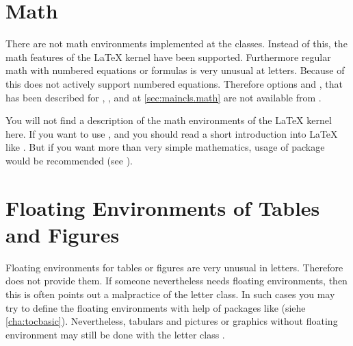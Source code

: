 \section{Math}
%
\BeginIndexGroup
{}%
%
%

There are not math environments implemented at the \KOMAScript{}
classes. Instead of this, the math features of the \LaTeX{} kernel have been
supported. Furthermore regular math with numbered
equations or formulas is very unusual at letters. Because of this
 does not actively support numbered equations. Therefore
options  and ,
that has been described for , , and
 at \autoref{sec:maincls.math} are not available from
.

You will not find a description of the math environments of the \LaTeX{} kernel
here. If you want to use ,
 and
 you should read a short introduction
into \LaTeX{} like \cite{lshort}. But if you want more than
very simple mathematics, usage of package  would be
recommended (see \cite{package:amsmath}).%
%
\EndIndexGroup


\section{Floating Environments of Tables and Figures}

Floating environments for tables or figures are very unusual in
letters. Therefore  does not provide
them. If someone nevertheless needs floating environments, then this is often
points out a malpractice of the letter class. In such cases you may try to
define the floating environments with help of packages like  (siehe
\autoref{cha:tocbasic}). Nevertheless, tabulars and pictures or graphics
without floating environment may still be done with the letter class
.




